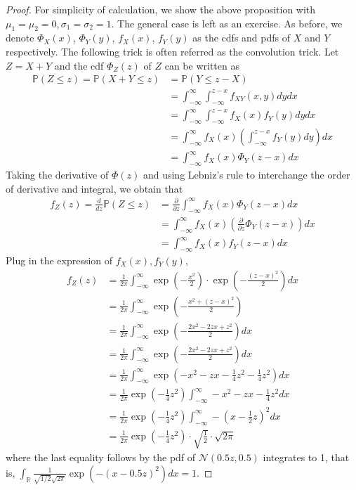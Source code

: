 \documentclass{article}
\newcommand{\R}{\mathbb{R}}
\DeclareMathOperator*{\1}{\mathbbm{1}}
\newcommand{\Prob}[1]{\mathbb{P}( #1 )}
\newcommand{\cN}{\mathcal{N}}
\theoremstyle{definition}
\theoremstyle{remark}
\begin{document}
  \begin{proof}
    For simplicity of calculation, we show the above proposition with $\mu_1=\mu_2=0, \sigma_1=\sigma_2=1$. The general case is left as an exercise. As before, we denote $\Phi_X(x)$, $\Phi_Y(y)$, $f_X(x)$, $f_Y(y)$ as the cdfs and pdfs of $X$ and $Y$ respectively. The following trick is often referred as the convolution trick. Let $Z=X+Y$ and the cdf $\Phi_Z(z)$ of $Z$ can be written as 
    \begin{align*}
      \Prob{Z\le z} = \Prob{X+Y\le z}&=\Prob{Y\le z-X}\\
      &=\int_{-\infty}^\infty \int_{-\infty }^{z-x}f_{XY}(x,y)dydx\\
      &=\int_{-\infty}^\infty \int_{-\infty }^{z-x}f_{X}(x)f_{Y}(y)dydx\\
      &=\int_{-\infty}^\infty f_{X}(x)\left( \int_{-\infty }^{z-x}f_{Y}(y)dy\right)dx\\
      &=\int_{-\infty}^\infty f_{X}(x) \Phi_Y(z-x)dx
    \end{align*}
    Taking the derivative of $\Phi(z)$ and using Lebniz's rule to interchange the order of derivative and integral, we obtain that
    \begin{align*}
      f_Z(z)=\frac{d}{dz}\Prob{Z\le z}&=\frac{\partial }{\partial z}\int_{-\infty}^\infty f_{X}(x) \Phi_Y(z-x)dx\\
      &=\int_{-\infty}^\infty f_{X}(x) \left(\frac{\partial }{\partial z}\Phi_Y(z-x)\right)dx\\
      &=\int_{-\infty}^\infty f_{X}(x) f_Y(z-x)dx
    \end{align*}
    Plug in the expression of $f_X(x), f_Y(y)$, 
    \begin{align*}
      f_Z(z)&=\frac{1}{{2\pi}}\int_{-\infty}^\infty  \exp\left(-\frac{x^2}{2}\right)\cdot \exp\left(-\frac{(z-x)^2}{2}\right)dx\\
      &=\frac{1}{2\pi}\int_{-\infty}^\infty \exp\left(-\frac{x^2+(z-x)^2}{2}\right)\\
      &=\frac{1}{2\pi}\int_{-\infty}^\infty \exp\left(-\frac{2x^2-2zx+z^2}{2}\right)dx\\
      &=\frac{1}{2\pi}\int_{-\infty}^\infty \exp\left(-\frac{2x^2-2zx+z^2}{2}\right)dx\\
      &=\frac{1}{2\pi}\int_{-\infty}^\infty \exp\left(-{x^2-zx-\frac{1}{4}z^2}-\frac{1}{4}z^2\right)dx\\
      &=\frac{1}{2\pi}\exp\left(-\frac{1}{4}z^2\right)\int_{-\infty}^\infty -{x^2-zx-\frac{1}{4}z^2}dx\\
      &=\frac{1}{2\pi}\exp\left(-\frac{1}{4}z^2\right)\int_{-\infty}^\infty -{\left(x-\frac{1}{2}z\right)^2}dx\\
      &=\frac{1}{2\pi}\exp\left(-\frac{1}{4}z^2\right)\cdot\sqrt{
        \frac12}\cdot\sqrt{2\pi}
    \end{align*}
    where the last equality follows by the pdf of $\cN(0.5z,0.5)$ integrates to 1, that is, $\int_{\R}\frac{1}{\sqrt{1/2}\sqrt{2\pi}}\exp(-(x-0.5z)^2)dx=1$.
  \end{proof}
\end{document}
